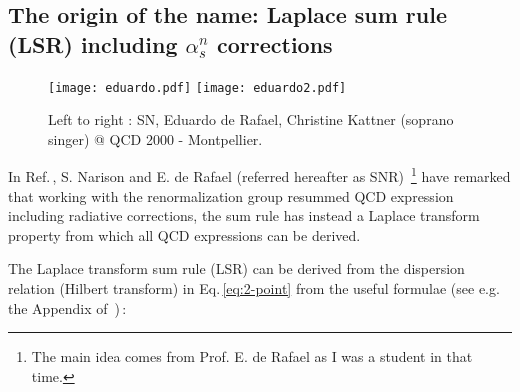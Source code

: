 \documentclass[aps,prd,groupedaddress,nofootinbib]{revtex4-1}
\begin{document}
\subsection{The origin of the name: Laplace sum rule (LSR) including $\alpha_s^n$ corrections}
\begin{figure}[hbt]
\begin{center}
\texttt{[image: eduardo.pdf]}
\texttt{[image: eduardo2.pdf]}
\vspace*{-0.15cm}
\caption{\footnotesize  Left to right : SN, Eduardo de Rafael, Christine Kattner (soprano singer)  @ QCD 2000 - Montpellier.}
\label{fig:eduardo}
\end{center}
\vspace*{-0.5cm}
\end{figure} 
In Ref.\,\cite{SNR}, S. Narison and E. de Rafael (referred hereafter as SNR) \,\footnote{The main idea comes from Prof. E. de Rafael as I was a student in that time.} have remarked that working with the renormalization group resummed QCD expression
including radiative corrections, the sum rule has instead a Laplace transform property from which all QCD expressions can be derived. 

The Laplace transform sum rule (LSR)  can be derived from the dispersion relation (Hilbert transform) in Eq.\,\ref{eq:2-point} from the useful formulae  (see e.g. the Appendix of \,\cite{SNB1,SNB2})\,:
\end{document}
